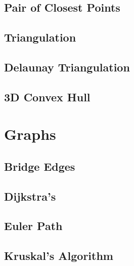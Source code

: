 \subsection{Pair of Closest Points}
\raggedbottom
\hrulefill
\subsection{Triangulation}
\raggedbottom
\hrulefill
\subsection{Delaunay Triangulation}
\raggedbottom
\hrulefill
\subsection{3D Convex Hull}
\raggedbottom
\hrulefill

\section{Graphs}
\subsection{Bridge Edges}
\raggedbottom
\hrulefill
\subsection{Dijkstra's}
\raggedbottom
\hrulefill
\subsection{Euler Path}
\raggedbottom
\hrulefill
\subsection{Kruskal's Algorithm}
\raggedbottom
\hrulefill

